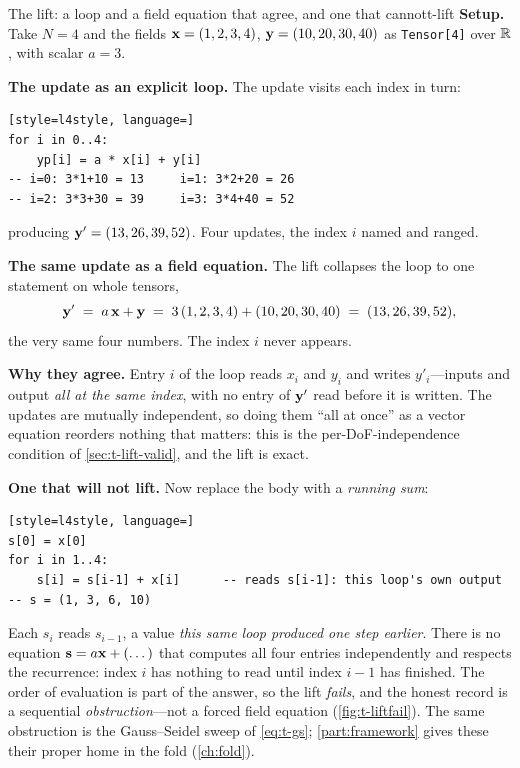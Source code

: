 \begin{workedexample}{The lift: a loop and a field equation that agree, and one that cannot}{t-lift}
\textbf{Setup.} Take $N=4$ and the fields $\mathbf{x}=(1,2,3,4)$, $\mathbf{y}=(10,20,30,40)$
as \lstinline[style=l4style]|Tensor[4]| over $\mathbb{R}$, with scalar $a=3$.

\tcblower
\textbf{The update as an explicit loop.} The  update visits each index
in turn:
\begin{lstlisting}[style=l4style, language=]
for i in 0..4:
    yp[i] = a * x[i] + y[i]
-- i=0: 3*1+10 = 13     i=1: 3*2+20 = 26
-- i=2: 3*3+30 = 39     i=3: 3*4+40 = 52
\end{lstlisting}
producing $\mathbf{y}'=(13,26,39,52)$. Four updates, the index $i$ named and ranged.

\textbf{The same update as a field equation.} The lift collapses the loop to one
statement on whole tensors,
\[
  \mathbf{y}' \;=\; a\,\mathbf{x} + \mathbf{y} \;=\; 3\,(1,2,3,4) + (10,20,30,40) \;=\; (13,26,39,52),
\]
the very same four numbers. The index $i$ never appears.

\textbf{Why they agree.} Entry $i$ of the loop reads $x_i$ and $y_i$ and writes
$y'_i$---inputs and output \emph{all at the same index}, with no entry of $\mathbf{y}'$
read before it is written. The updates are mutually independent, so doing them
``all at once'' as a vector equation reorders nothing that matters: this is the
per-DoF-independence condition of \cref{sec:t-lift-valid}, and the lift is exact.

\textbf{One that will not lift.} Now replace the body with a \emph{running sum}:
\begin{lstlisting}[style=l4style, language=]
s[0] = x[0]
for i in 1..4:
    s[i] = s[i-1] + x[i]      -- reads s[i-1]: this loop's own output
-- s = (1, 3, 6, 10)
\end{lstlisting}
Each $s_i$ reads $s_{i-1}$, a value \emph{this same loop produced one step
earlier}. There is no equation $\mathbf{s} = a\mathbf{x} + (\dots)$ that computes all four
entries independently and respects the recurrence: index $i$ has nothing to read
until index $i-1$ has finished. The order of evaluation is part of the answer, so
the lift \emph{fails}, and the honest record is a sequential
\emph{obstruction}---not a forced field equation
(\cref{fig:t-liftfail}). The same obstruction is the Gauss--Seidel sweep of
\cref{eq:t-gs}; \cref{part:framework} gives these their proper home in the fold
(\cref{ch:fold}).
\end{workedexample}

